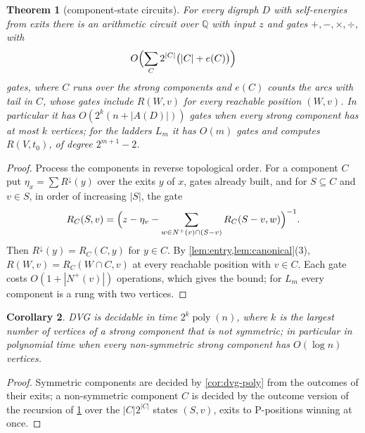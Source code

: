 \documentclass[11pt]{amsart}
\theoremstyle{plain}
\newtheorem{theorem}{Theorem}[section]
\newtheorem{corollary}[theorem]{Corollary}
\theoremstyle{definition}
\theoremstyle{remark}
\numberwithin{equation}{section}
\newcommand{\QQ}{\mathbb{Q}}
\newcommand{\poly}{\operatorname{poly}}
\newcommand{\Rdown}{R^{\downarrow}}
\newcommand{\nplus}{N^{+}}
\begin{document}
\begin{theorem}[component-state circuits]\label{thm:component-circuits}
For every digraph $D$ with self-energies from exits there is an arithmetic circuit over $\QQ$ with input $z$ and gates $+,-,\times,\div$, with
\[
O\Bigl(\sum_{C}2^{|C|}\bigl(|C|+e(C)\bigr)\Bigr)
\]
gates, where $C$ runs over the strong components and $e(C)$ counts the arcs with tail in $C$, whose gates include $R(W,v)$ for every reachable position $(W,v)$. In particular it has $O(2^{k}(n+|A(D)|))$ gates when every strong component has at most $k$ vertices; for the ladders $L_m$ it has $O(m)$ gates and computes $R(V,t_0)$, of degree $2^{m+1}-2$.
\end{theorem}
\begin{proof}
Process the components in reverse topological order. For a component $C$ put $\eta_x=\sum\Rdown(y)$ over the exits $y$ of $x$, gates already built, and for $S\subseteq C$ and $v\in S$, in order of increasing $|S|$, the gate
\[
R_C(S,v)=\Bigl(z-\eta_v-\sum_{w\in\nplus(v)\cap(S-v)}R_C(S-v,w)\Bigr)^{-1}.
\]
Then $\Rdown(y)=R_C(C,y)$ for $y\in C$. By \cref{lem:entry,lem:canonical}(3), $R(W,v)=R_C(W\cap C,v)$ at every reachable position with $v\in C$. Each gate costs $O(1+|\nplus(v)|)$ operations, which gives the bound; for $L_m$ every component is a rung with two vertices.
\end{proof}

\begin{corollary}\label{cor:small-components}
DVG is decidable in time $2^{k}\poly(n)$, where $k$ is the largest number of vertices of a strong component that is not symmetric; in particular in polynomial time when every non-symmetric strong component has $O(\log n)$ vertices.
\end{corollary}
\begin{proof}
Symmetric components are decided by \cref{cor:dvg-poly} from the outcomes of their exits; a non-symmetric component $C$ is decided by the outcome version of the recursion of \cref{thm:component-circuits} over the $|C|2^{|C|}$ states $(S,v)$, exits to P-positions winning at once.
\end{proof}
\end{document}
